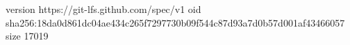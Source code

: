 version https://git-lfs.github.com/spec/v1
oid sha256:18da0d861dc04ae434c265f7297730b09f544c87d93a7d0b57d001af43466057
size 17019
